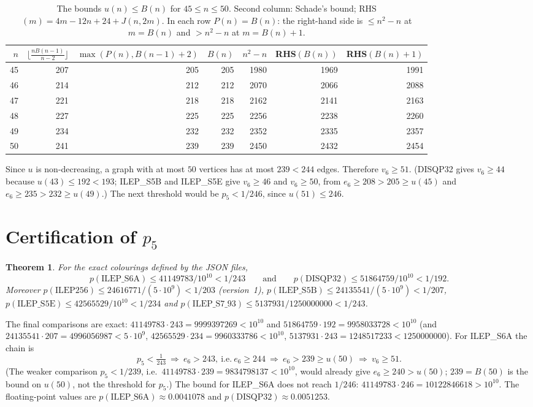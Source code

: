 \documentclass[10pt,a4paper]{article}
\newtheorem{theorem}{Theorem}
\begin{document}
\begin{table}[ht]
\centering
\begin{tabular}{rrrrrrr}
\toprule
$n$ & $\lfloor\frac{nB(n-1)}{n-2}\rfloor$ & $\max(P(n),B(n-1){+}2)$ & $B(n)$ & $n^2-n$ & RHS$(B(n))$ & RHS$(B(n){+}1)$\\
\midrule
45 & 207 & 205 & 205 & 1980 & 1969 & 1991\\
46 & 214 & 212 & 212 & 2070 & 2066 & 2088\\
47 & 221 & 218 & 218 & 2162 & 2141 & 2163\\
48 & 227 & 225 & 225 & 2256 & 2238 & 2260\\
49 & 234 & 232 & 232 & 2352 & 2335 & 2357\\
50 & 241 & 239 & 239 & 2450 & 2432 & 2454\\
\bottomrule
\end{tabular}
\caption{The bounds $u(n)\le B(n)$ for $45\le n\le 50$. Second column: Schade's bound; RHS$(m)=4m-12n+24+J(n,2m)$. In each row $P(n)=B(n)$:
the right-hand side is $\le n^2-n$ at $m=B(n)$ and $>n^2-n$ at $m=B(n)+1$.}
\label{tab:u}
\end{table}

Since $u$ is non-decreasing, a graph with at most $50$ vertices has at most $239<244$ edges. Therefore
$v_6\ge51$. (DISQP32 gives $v_6\ge44$ because $u(43)\le192<193$; ILEP\_S5B and ILEP\_S5E give $v_6\ge46$ and
$v_6\ge50$, from $e_6\ge208>205\ge u(45)$ and $e_6\ge235>232\ge u(49)$.) The next threshold would be
$p_5<1/246$, since $u(51)\le246$.

\section{Certification of \texorpdfstring{$p_5$}{p5}}

\begin{theorem}\label{thm:cert}
For the exact colourings defined by the JSON files,
\[
p(\mathrm{ILEP\_S6A})\le 41149783/10^{10}<1/243
\qquad\text{and}\qquad
p(\mathrm{DISQP32})\le 51864759/10^{10}<1/192 .
\]
Moreover $p(\mathrm{ILEP256})\le 24616771/(5\cdot10^9)<1/203$ (version~1),
$p(\mathrm{ILEP\_S5B})\le24135541/(5\cdot10^9)<1/207$, $p(\mathrm{ILEP\_S5E})\le42565529/10^{10}<1/234$ and
$p(\mathrm{ILEP\_S7\_93})\le5137931/1250000000<1/243$.
\end{theorem}

The final comparisons are exact: $41149783\cdot243=9999397269<10^{10}$ and $51864759\cdot192=9958033728<10^{10}$
(and $24135541\cdot207=4996056987<5\cdot10^9$, $42565529\cdot234=9960333786<10^{10}$,
$5137931\cdot243=1248517233<1250000000$). For ILEP\_S6A the chain is
\[
p_5<\tfrac1{243}\ \Longrightarrow\ e_6>243,\ \text{i.e.}\ e_6\ge244\ \Longrightarrow\ e_6>239\ge u(50)\ \Longrightarrow\ v_6\ge51 .
\]
(The weaker comparison $p_5<1/239$, i.e.\ $41149783\cdot239=9834798137<10^{10}$, would already give $e_6\ge240>u(50)$;
$239=B(50)$ is the bound on $u(50)$, not the threshold for $p_5$.) The bound for ILEP\_S6A does not reach $1/246$:
$41149783\cdot246=10122846618>10^{10}$. The floating-point
values are $p(\mathrm{ILEP\_S6A})\approx0.0041078$ and $p(\mathrm{DISQP32})\approx0.0051253$.
\end{document}
